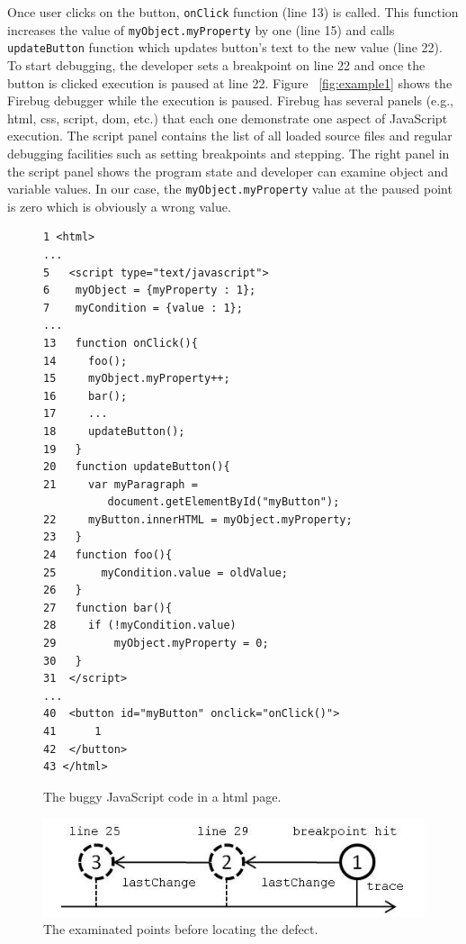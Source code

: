 \documentclass[preprint]{sigplanconf}
\begin{document}
Once user clicks on the button, \texttt{onClick} function (line 13) is called. This function increases the value of \texttt{myObject.myProperty} by one (line 15) and calls \texttt{updateButton} function which updates button's text to the new value (line 22). To start debugging, the developer sets a breakpoint on line 22 and once the button is clicked execution is paused at line 22. Figure ~\ref{fig:example1} shows the Firebug debugger while the execution is paused. Firebug has several panels (e.g., html, css, script, dom, etc.) that each one demonstrate one aspect of JavaScript execution. The script panel contains the list of all loaded source files and regular debugging facilities such as setting breakpoints and stepping. The right panel in the script panel shows the program state and developer can examine object and variable values. In our case, the \texttt{myObject.myProperty} value at the paused point is zero which is obviously a wrong value. 

\begin{figure}[htp]
\begin{verbatim}
1 <html>
...
5   <script type="text/javascript">
6    myObject = {myProperty : 1};
7    myCondition = {value : 1};
...
13   function onClick(){
14     foo();
15     myObject.myProperty++;
16     bar();
17     ...
18     updateButton();
19   }
20   function updateButton(){
21     var myParagraph =
          document.getElementById("myButton");
22     myButton.innerHTML = myObject.myProperty;
23   }   
24   function foo(){
25  	 myCondition.value = oldValue;
26   }  
27   function bar(){ 
28     if (!myCondition.value)
29         myObject.myProperty = 0;
30   }
31  </script> 
...
40  <button id="myButton" onclick="onClick()">
41  	1 
42  </button>
43 </html>
\end{verbatim}
\caption{The buggy JavaScript code in a html page.}
\label{fig:js-code}
\end{figure}


\begin{figure}[htp]
\includegraphics{5-example-points.jpg}
\caption{The examinated points before locating the defect.}
\label{fig:example-points}
\end{figure}
\end{document}

